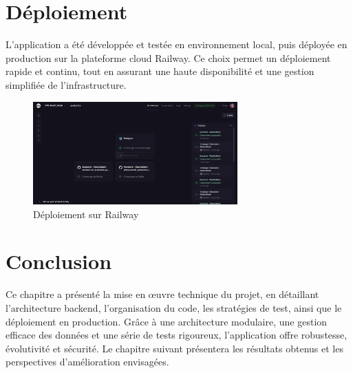 \section{Déploiement}

L'application a été développée et testée en environnement local, puis déployée en production sur la plateforme cloud Railway. Ce choix permet un déploiement rapide et continu, tout en assurant une haute disponibilité et une gestion simplifiée de l'infrastructure.

\begin{figure}[H]
    \centering
    \includegraphics[width=0.7\textwidth]{images/backend/deploiement.png}
    \caption{Déploiement sur Railway}
    \label{fig:deploiement}
\end{figure}

\section{Conclusion}

Ce chapitre a présenté la mise en œuvre technique du projet, en détaillant l’architecture backend, l’organisation du code, les stratégies de test, ainsi que le déploiement en production. Grâce à une architecture modulaire, une gestion efficace des données et une série de tests rigoureux, l’application offre robustesse, évolutivité et sécurité. Le chapitre suivant présentera les résultats obtenus et les perspectives d’amélioration envisagées.
